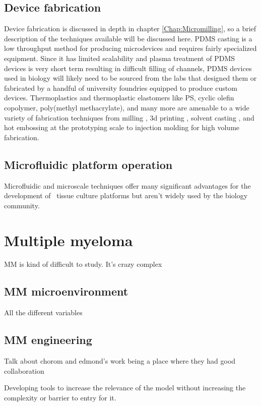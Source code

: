 \subsection{Device fabrication}
Device fabrication is discussed in depth in chapter \ref{Chap:Micromilling}, so a brief description of the techniques available will be discussed here. PDMS casting is a low throughput method for producing microdevices and requires fairly specialized equipment. Since it has limited scalability and plasma treatment of PDMS devices is very short term resulting in difficult filling of channels, PDMS devices used in biology will likely need to be sourced from the labs that designed them or fabricated by a handful of university foundries equipped to produce custom devices. Thermoplastics and thermoplastic elastomers like PS, cyclic olefin copolymer, poly(methyl methacrylate), and many more are amenable to a wide variety of fabrication techniques from milling \cite{Guckenberger2015b}, 3d printing \cite{Au2014}, solvent casting \cite{Borysiak2013b}, and hot embossing \cite{Becker2000} at the prototyping scale to injection molding \cite{Piotter1997} for high volume fabrication. 

\subsection{Microfluidic platform operation}
Microfluidic and microscale techniques offer many significant advantages for the development of \invitro\ tissue culture platforms but aren't widely used by the biology community. 


\section{Multiple myeloma}
MM is kind of difficult to study. It's crazy complex


\subsection{MM microenvironment}
All the different variables


\subsection{MM engineering}

Talk about chorom and edmond's work being a place where they had good collaboration 

Developing tools to increase the relevance of the model without increasing the complexity or barrier to entry for it. 
